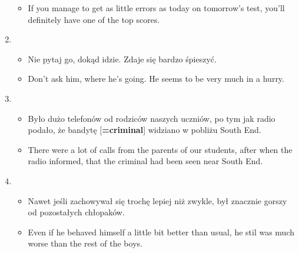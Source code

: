 \documentclass[a4paper]{article}
\begin{document}
\begin{enumerate}
\begin{itemize}
        \item If you manage to get as little errors as today on tomorrow's test, you'll definitely have one of the top scores.
    \end{itemize}
    \item \begin{itemize}
        \item Nie pytaj go, dokąd idzie. Zdaje się bardzo śpieszyć.
        \item Don't ask him, where he's going. He seems to be very much in a hurry.
    \end{itemize}
    \item \begin{itemize}
        \item Było dużo telefonów od rodziców naszych uczniów, po tym jak radio podało, że bandytę [{\bf=criminal}] widziano w pobliżu South End.
        \item There were a lot of calls from the parents of our students, after when the radio informed, that the criminal had been seen near South End.
    \end{itemize}
    \item \begin{itemize}
        \item Nawet jeśli zachowywał się trochę lepiej niż zwykle, był znacznie gorszy od pozostałych chłopaków.
        \item Even if he behaved himself a little bit better than usual, he stil was much worse than the rest of the boys.
    \end{itemize}
\end{enumerate}
\end{document}
